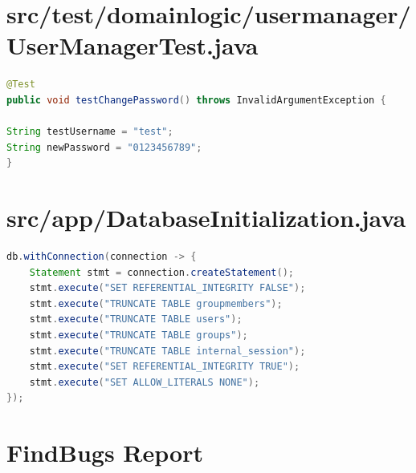 \documentclass[12pt,DIV14,BCOR10mm,a4paper,twoside,parskip=half-,headsepline,headinclude,english,ngerman,bibliography=totocnumbered]{scrreprt}
\begin{document}
\printbibliography

\printacronyms[title=Abkürzungsverzeichnis,toctitle=Abkürzungsverzeichnis]
\printglossary[type=main]

\listoffigures      %


\begin{appendices}

\chapter{src/test/domainlogic/usermanager/UserManagerTest.java}
\begin{lstlisting}[language=Java,caption=Hardkodiertes Passwort in einem Test aus der Klasse \texttt{UserManagerTest},label={lst:staticanalysis-hardcoded-pw}]
@Test
public void testChangePassword() throws InvalidArgumentException {

String testUsername = "test";
String newPassword = "0123456789";
}
\end{lstlisting}

\chapter{src/app/DatabaseInitialization.java}
\begin{lstlisting}[language=Java,caption=Von SecureAssist gefundenes False Positive Beispiel für Query Injections,label={lst:staticanalysis-query-injection}]
db.withConnection(connection -> {
	Statement stmt = connection.createStatement();
	stmt.execute("SET REFERENTIAL_INTEGRITY FALSE");
	stmt.execute("TRUNCATE TABLE groupmembers");
	stmt.execute("TRUNCATE TABLE users");
	stmt.execute("TRUNCATE TABLE groups");
	stmt.execute("TRUNCATE TABLE internal_session");
	stmt.execute("SET REFERENTIAL_INTEGRITY TRUE");
	stmt.execute("SET ALLOW_LITERALS NONE");
});
\end{lstlisting}

\chapter{FindBugs Report}
\label{staticanalysis-find-bugs}
%

\end{appendices}
\end{document}

